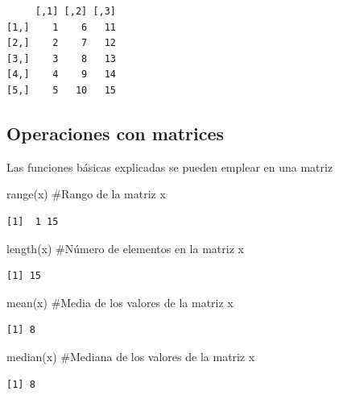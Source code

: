 \documentclass[
  letterpaper,
]{scrbook}
\newenvironment{Shaded}{\begin{snugshade}}{\end{snugshade}}
\newcommand{\CommentTok}[1]{\textcolor[rgb]{0.37,0.37,0.37}{#1}}
\newcommand{\FunctionTok}[1]{\textcolor[rgb]{0.28,0.35,0.67}{#1}}
\newcommand{\NormalTok}[1]{\textcolor[rgb]{0.00,0.23,0.31}{#1}}
\begin{document}
\begin{verbatim}
     [,1] [,2] [,3]
[1,]    1    6   11
[2,]    2    7   12
[3,]    3    8   13
[4,]    4    9   14
[5,]    5   10   15
\end{verbatim}

\hypertarget{operaciones-con-matrices}{%
\subsection{Operaciones con matrices}\label{operaciones-con-matrices}}

Las funciones básicas explicadas se pueden emplear en una matriz

\begin{Shaded}
\begin{Highlighting}[]
\FunctionTok{range}\NormalTok{(x) }\CommentTok{\#Rango de la matriz x}
\end{Highlighting}
\end{Shaded}

\begin{verbatim}
[1]  1 15
\end{verbatim}

\begin{Shaded}
\begin{Highlighting}[]
\FunctionTok{length}\NormalTok{(x) }\CommentTok{\#Número de elementos en la matriz x}
\end{Highlighting}
\end{Shaded}

\begin{verbatim}
[1] 15
\end{verbatim}

\begin{Shaded}
\begin{Highlighting}[]
\FunctionTok{mean}\NormalTok{(x) }\CommentTok{\#Media de los valores de la matriz x}
\end{Highlighting}
\end{Shaded}

\begin{verbatim}
[1] 8
\end{verbatim}

\begin{Shaded}
\begin{Highlighting}[]
\FunctionTok{median}\NormalTok{(x) }\CommentTok{\#Mediana de los valores de la matriz x}
\end{Highlighting}
\end{Shaded}

\begin{verbatim}
[1] 8
\end{verbatim}
\end{document}
